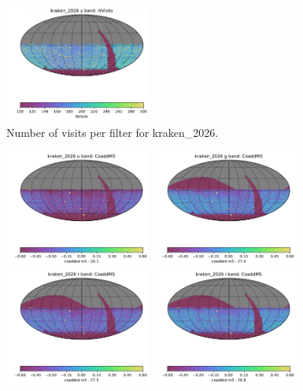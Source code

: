 \documentclass[DM,authoryear,toc]{lsstdoc}
\begin{document}
\begin{figure}[ht]
\includegraphics[width=0.43\textwidth]{figures/kraken_2026_NVisits_y_band_HEAL_SkyMap}
\caption{Number of visits per filter for kraken\_2026.
\label{fig:baseline_nvisits}}
\end{figure}

\begin{figure}[ht]
\centering
\includegraphics[width=0.43\textwidth]{figures/kraken_2026_CoaddM5_u_band_HEAL_SkyMap}
\includegraphics[width=0.43\textwidth]{figures/kraken_2026_CoaddM5_g_band_HEAL_SkyMap} \\
\includegraphics[width=0.43\textwidth]{figures/kraken_2026_CoaddM5_r_band_HEAL_SkyMap}
\includegraphics[width=0.43\textwidth]{figures/kraken_2026_CoaddM5_i_band_HEAL_SkyMap}  \\

\end{figure}
\end{document}
